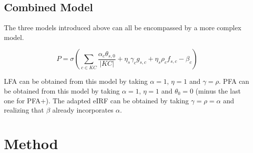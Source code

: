 \documentclass{scrartcl}
\begin{document}
\subsection{Combined Model}
The three models introduced above can all be encompassed by a more complex model.

\begin{equation}
P = \sigma(\sum_{c \in KC}\frac{\alpha_c \theta_{s,0}}{|KC|}+\eta_{s} \gamma_{c} g_{s,c} + \eta_{s}\rho_{c} f_{s,c} - \beta_{c})
\end{equation}

LFA can be obtained from this model by taking $\alpha=1$, $\eta=1$ and $\gamma=\rho$. PFA can be obtained from this model by taking $\alpha=1$, $\eta=1$ and $\theta_{0}=0$ (minus the last one for PFA+). The adapted eIRF can be obtained by taking $\gamma=\rho=\alpha$ and realizing that $\beta$ already incorporates $\alpha$.

\begin{comment}
\begin{mycapequ}
\begin{equation}
\begin{aligned}
    \gamma_{c}:  & \gamma_{c}*\frac{\sum_{s \in S} \eta_{s}*g_{s,c}} {|g_{c}|} \\
    \rho_{c}:  & \rho_{c}*\frac{\sum_{s \in S} \eta_{s}*f_{s,c}} {|f_{c}|} \\
    \theta_{s,0}: & \theta_{s,0}*\frac {\sum_{c \in KC} \alpha_{c}*t_{s,c}} {|t_{s}|}
\end{aligned}
\end{equation}
\caption{Comparison of PFA parameters to full model parameters}
\end{mycapequ}

\begin{mycapequ}
\begin{equation}
\begin{aligned}
    \eta_{s}: \eta_{s}* \frac{\sum_{c \in KC} \frac{\gamma_{c} g_{c} +  f_{c}}{\alpha_{c}}}{g_{c}+f_{c}} \\
    \beta_{c}:  & \rho_{c}*\frac{\sum_{s \in S} \eta_{s}*f_{s,c}} {|f_{c}|}
\end{aligned}
\end{equation}
\caption{Comparison of seIRT parameters to full model parameters}
\end{mycapequ}
\end{comment}



\section{Method}
\end{document}
